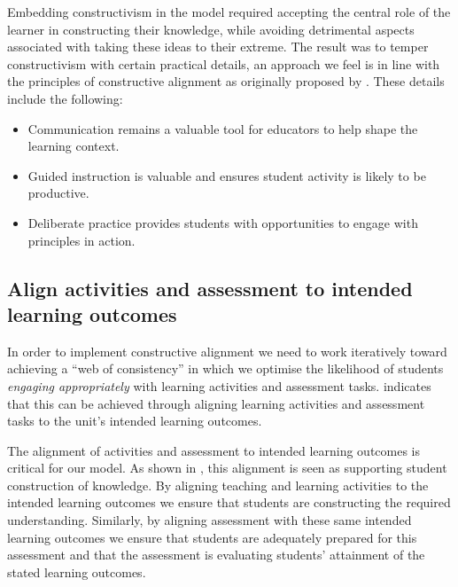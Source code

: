 Embedding constructivism in the model required accepting the central role of the learner in constructing their knowledge, while avoiding detrimental aspects associated with taking these ideas to their extreme. The result was to temper constructivism with certain practical details, an approach we feel is in line with the principles of constructive alignment as originally proposed by \citet{Biggs:1996c}. These details include the following:

\begin{itemize}[noitemsep,nolistsep]
	\item Communication remains a valuable tool for educators to help shape the learning context.
	\item Guided instruction is valuable and ensures student activity is likely to be productive.
	\item Deliberate practice provides students with opportunities to engage with principles in action.
\end{itemize}


\subsection{Align activities and assessment to intended learning outcomes} %
\label{ssub:align_activities_and_assessment_to_intended_learning_outcomes_}

In order to implement constructive alignment we need to work iteratively toward achieving a ``web of consistency'' \cite{Biggs:1999} in which we optimise the likelihood of students \emph{engaging appropriately} with learning activities and assessment tasks. \cite{Biggs:1996c} indicates that this can be achieved through aligning learning activities and assessment tasks to the unit's intended learning outcomes. 

The alignment of activities and assessment to intended learning outcomes is critical for our model. As shown in , this alignment is seen as supporting student construction of knowledge. By aligning teaching and learning activities to the intended learning outcomes we ensure that students are constructing the required understanding. Similarly, by aligning assessment with these same intended learning outcomes we ensure that students are adequately prepared for this assessment and that the assessment is evaluating students' attainment of the stated learning outcomes. 

